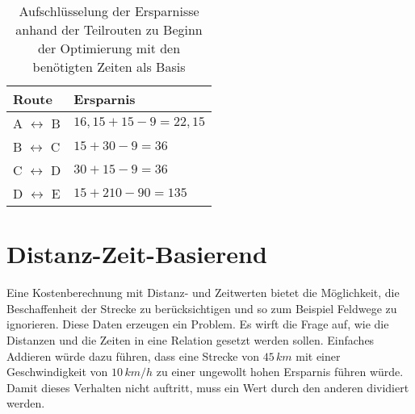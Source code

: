 \begin{table}[htb]%
\centering%
\begin{tabular}{p{3cm}|p{4cm}}
Route & Ersparnis \\ 
\hline 
A $\leftrightarrow$ B & $16,15 + 15 - 9 = 22,15$ \\ 
B $\leftrightarrow$ C & $15 + 30 - 9 = 36$ \\ 
C $\leftrightarrow$ D & $30 + 15 - 9 = 36$ \\ 
D $\leftrightarrow$ E & $15 + 210 - 90 = 135$ \\ 
\end{tabular} 
\caption{Aufschlüsselung der Ersparnisse anhand der Teilrouten zu Beginn der Optimierung mit den benötigten Zeiten als Basis}
\label{tab:distSavingsZeit}
\end{table}

\section{Distanz-Zeit-Basierend}
\label{sec:disZeitBase}

Eine Kostenberechnung mit Distanz- und Zeitwerten bietet die Möglichkeit, die Beschaffenheit der Strecke zu berücksichtigen und so zum Beispiel Feldwege zu ignorieren. 
Diese Daten erzeugen ein Problem. 
Es wirft die Frage auf, wie die Distanzen und die Zeiten in eine Relation gesetzt werden sollen. 
Einfaches Addieren würde dazu führen, dass eine Strecke von $45\,km$ mit einer Geschwindigkeit von $10\,km/h$ zu einer ungewollt hohen Ersparnis führen würde. 
Damit dieses Verhalten nicht auftritt, muss ein Wert durch den anderen dividiert werden. 

